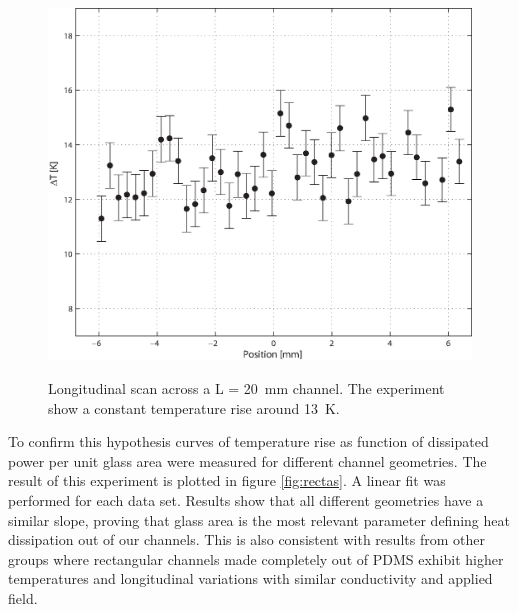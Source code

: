 \documentclass[twocolumn]{svjour3}       %
\begin{document}
\begin{figure}[h!]
\centering
\includegraphics[width=\columnwidth]{figs/long.eps}
\label{fig:long}
\caption{Longitudinal scan across a L = 20~mm channel. The experiment show a constant temperature rise around 13~K. }
\end{figure}

To confirm this hypothesis curves of temperature rise as function of dissipated power per unit glass area were measured for different channel geometries. The result of this experiment is plotted in figure \ref{fig:rectas}. A linear fit was performed for each data set. Results show that all different geometries have a similar slope, proving that glass area is the most relevant parameter defining heat dissipation out of our channels. This is also consistent with results from other groups \cite{competencia1} where rectangular channels made completely out of PDMS exhibit higher temperatures and longitudinal variations with similar conductivity and applied field. 
\end{document}
